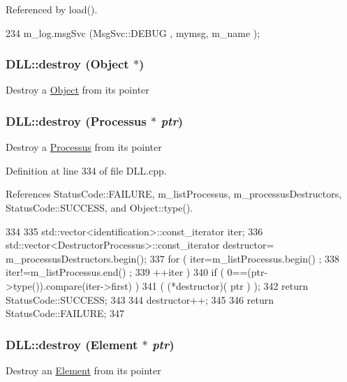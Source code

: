 Referenced by load().


\begin{DoxyCode}
234 { m_log.msgSvc (MsgSvc::DEBUG   , mymsg, m_name ); }
\end{DoxyCode}
\hypertarget{classDLL_a4334ca0b1639c39d905c3553f5b9d507}{
\subsubsection[{destroy}]{ DLL::destroy ({\bf Object} $\ast$)}}
\label{classDLL_a4334ca0b1639c39d905c3553f5b9d507}
Destroy a \hyperlink{classObject}{Object} from its pointer \hypertarget{classDLL_ac2ca6dfa120f123af42bff6f0b3fec5a}{
\subsubsection[{destroy}]{ DLL::destroy ({\bf Processus} $\ast$ {\em ptr})}}
\label{classDLL_ac2ca6dfa120f123af42bff6f0b3fec5a}
Destroy a \hyperlink{classProcessus}{Processus} from its pointer 

Definition at line 334 of file DLL.cpp.

References StatusCode::FAILURE, m\_\-listProcessus, m\_\-processusDestructors, StatusCode::SUCCESS, and Object::type().


\begin{DoxyCode}
334                                          {
335   std::vector<identification>::const_iterator iter;
336   std::vector<DestructorProcessus>::const_iterator destructor=
      m_processusDestructors.begin();
337   for ( iter=m_listProcessus.begin() ;
338         iter!=m_listProcessus.end() ;
339         ++iter ) {
340     if ( 0==(ptr->type()).compare(iter->first) ){
341       ( (*destructor)( ptr ) );
342       return StatusCode::SUCCESS;
343     }
344     destructor++;
345   }
346   return StatusCode::FAILURE;
347 }
\end{DoxyCode}
\hypertarget{classDLL_abbe40e8f9065dfcfef3df9decb60087b}{
\subsubsection[{destroy}]{ DLL::destroy ({\bf Element} $\ast$ {\em ptr})}}
\label{classDLL_abbe40e8f9065dfcfef3df9decb60087b}
Destroy an \hyperlink{classElement}{Element} from its pointer 

